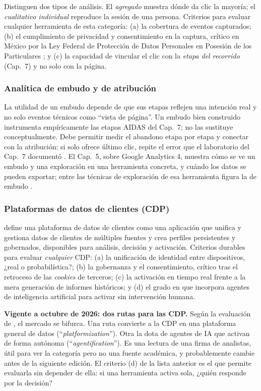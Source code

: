 Distinguen dos tipos de análisis. El \emph{agregado} muestra dónde da clic la
mayoría; el \emph{cualitativo individual} reproduce la sesión de una persona.
Criterios para evaluar cualquier herramienta de esta categoría: (a) la
cobertura de eventos capturados; (b) el cumplimiento de privacidad y
consentimiento en la captura, crítico en México por la Ley Federal de
Protección de Datos Personales en Posesión de los Particulares
\parencite{dof_lfpdppp2025}; y (c) la capacidad de vincular el clic con la
\emph{etapa del recorrido} (Cap.~7) y no solo con la página.

\subsubsection{Analítica de embudo y de atribución}

La utilidad de un embudo depende de que sus etapas reflejen una intención
real y no solo eventos técnicos como \enquote{vista de página}. Un embudo bien
construido instrumenta empíricamente las etapas AIDAS del Cap.~7; no las
sustituye conceptualmente. Debe permitir medir el abandono etapa por etapa
y conectar con la atribución: si solo ofrece último clic, repite el error que
el laboratorio del Cap.~7 documentó \parencite{anderl2016}. El
Cap.~5, sobre Google Analytics 4, muestra cómo se ve un embudo y una
exploración en una herramienta concreta, y cuándo los datos se pueden
exportar; entre las técnicas de exploración de esa herramienta figura la de
embudo \parencite{google2026ga4explorar}.

\subsubsection{Plataformas de datos de clientes (CDP)}

\textcite{gartner2026cdp} define una plataforma de datos de clientes como una
aplicación que unifica y gestiona datos de clientes de múltiples fuentes y crea
perfiles persistentes y gobernados, disponibles para análisis, decisión y
activación. Criterios durables para evaluar \emph{cualquier} CDP: (a) la
unificación de identidad entre dispositivos, ¿real o probabilística?; (b) la
gobernanza y el consentimiento, crítico tras el retroceso de las
\textit{cookies} de terceros; (c) la activación en tiempo real frente a la
mera generación de informes históricos; y (d) el grado en que incorpora agentes
de inteligencia artificial para activar sin intervención humana.

\begin{cajaFrontera}
\textbf{Vigente a octubre de 2026: dos rutas para las CDP.} Según la
evaluación de \textcite{gartner2026cdp}, el mercado se bifurca. Una ruta
convierte a la CDP en una plataforma general de datos
(\enquote{\textit{platformization}}). Otra la dota de agentes de IA que
activan de forma autónoma (\enquote{\textit{agentification}}). Es una lectura de
una firma de analistas, útil para ver la categoría pero no una fuente
académica, y probablemente cambie antes de la siguiente edición. El criterio
(d) de la lista anterior es el que permite evaluarla sin depender de ella: si
una herramienta activa sola, ¿quién responde por la decisión?
\end{cajaFrontera}

